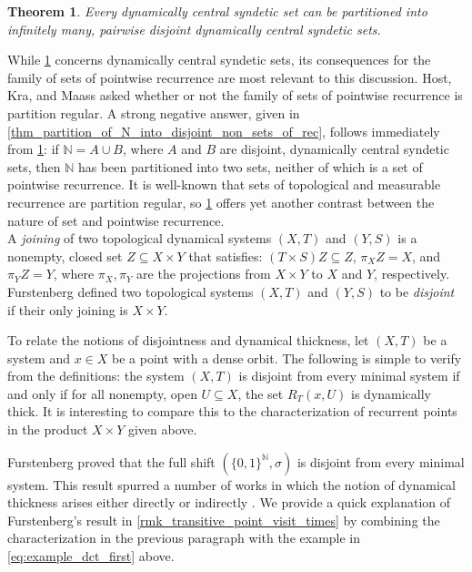\documentclass[letter,11pt]{article}
\theoremstyle{plain}
\theoremstyle{definition}
\theoremstyle{plain}
\newcounter{MainTheoremCounter}
\newtheorem{Maintheorem}[MainTheoremCounter]{Theorem}
\theoremstyle{plain}
\numberwithin{equation}{section}
\newcommand{\N}{\mathbb{N}}
\begin{document}
\begin{Maintheorem}
\label{mainthm_partition_of_dcs_sets}
    Every dynamically central syndetic set can be partitioned into infinitely many, pairwise disjoint dynamically central syndetic sets.
\end{Maintheorem}

While \cref{mainthm_partition_of_dcs_sets} concerns dynamically central syndetic sets, its consequences for the family of sets of pointwise recurrence are most relevant to this discussion.  Host, Kra, and Maass \cite[Question 6.5]{HostKraMaass2016} asked whether or not the family of sets of pointwise recurrence is partition regular.
A strong negative answer, given in \cref{thm_partition_of_N_into_disjoint_non_sets_of_rec}, follows immediately from \cref{mainthm_partition_of_dcs_sets}: if $\N = A \cup B$, where $A$ and $B$ are disjoint, dynamically central syndetic sets, then $\N$ has been partitioned into two sets, neither of which is a set of pointwise recurrence. It is well-known that sets of topological and measurable recurrence are partition regular, so \cref{mainthm_partition_of_dcs_sets} offers yet another contrast between the nature of set and pointwise recurrence.\\


A \emph{joining} of two topological dynamical systems $(X,T)$ and $(Y,S)$ is a nonempty, closed set $Z \subseteq X \times Y$ that satisfies: $(T \times S) Z \subseteq Z$, $\pi_X Z = X$, and $\pi_Y Z = Y$, where $\pi_X, \pi_Y$ are the projections from $X \times Y$ to $X$ and $Y$, respectively. Furstenberg \cite[Thm. II.2]{Furstenberg-disjointness} defined two topological systems $(X,T)$ and $(Y,S)$ to be \emph{disjoint} if their only joining is $X \times Y$.

To relate the notions of disjointness and dynamical thickness, let $(X,T)$ be a system and $x \in X$ be a point with a dense orbit.  The following is simple to verify from the definitions: the system $(X,T)$ is disjoint from every minimal system if and only if for all nonempty, open $U \subseteq X$, the set $R_T(x,U)$ is dynamically thick.  It is interesting to compare this to the characterization of recurrent points in the product $X \times Y$ given above.

Furstenberg proved \cite[Thm. II.2]{Furstenberg-disjointness} that the full shift $(\{0,1\}^{\N}, \sigma)$ is disjoint from every minimal system.  This result spurred a number of works in which the notion of dynamical thickness arises either directly or indirectly \cite{dong_shao_ye_2012, glasner_tsankov_weiss_zucker_2021, Huang_Shao_Ye_2019, huang_ye_2005,kennedy_raum_salomon_2022}.  We provide a quick explanation of Furstenberg's result in \cref{rmk_transitive_point_visit_times} by combining the characterization in the previous paragraph with the example in \eqref{eq:example_dct_first} above.
\end{document}
